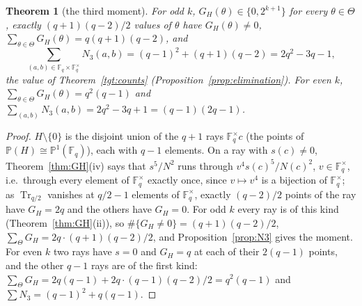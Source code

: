 \documentclass[12pt,a4paper]{amsart}
\newtheorem{theorem}{Theorem}[section]
\theoremstyle{definition}
\newcommand{\F}{\mathbb{F}}
\newcommand{\Tr}{\operatorname{Tr}}
\begin{document}
\begin{theorem}[the third moment]\label{thm:N3value}
For odd $k$, $G_H(\theta)\in\{0,2^{k+1}\}$ for every $\theta\in\Theta$, exactly $(q+1)(q-2)/2$ values of $\theta$ have $G_H(\theta)\ne0$, $\sum_{\theta\in\Theta}G_H(\theta)=q(q+1)(q-2)$, and
\[
\sum_{(a,b)\in\F_q\times\F_q^\times}N_3(a,b)=(q-1)^2+(q+1)(q-2)=2q^2-3q-1 ,
\]
the value of Theorem~\ref{tgt:counts} (Proposition~\ref{prop:elimination}). For even $k$, $\sum_{\theta\in\Theta}G_H(\theta)=q^2(q-1)$ and $\sum_{(a,b)}N_3(a,b)=2q^2-3q+1=(q-1)(2q-1)$.
\end{theorem}
\begin{proof}
$H\setminus\{0\}$ is the disjoint union of the $q+1$ rays $\F_q^\times c$ (the points of $\mathbb P(H)\cong\mathbb P^1(\F_q)$), each with $q-1$ elements. On a ray with $s(c)\ne0$, Theorem~\ref{thm:GH}(iv) says that $s^5/N^2$ runs through $v^4s(c)^5/N(c)^2$, $v\in\F_q^\times$, i.e.\ through every element of $\F_q^\times$ exactly once, since $v\mapsto v^4$ is a bijection of $\F_q^\times$; as $\Tr_{q/2}$ vanishes at $q/2-1$ elements of $\F_q^\times$, exactly $(q-2)/2$ points of the ray have $G_H=2q$ and the others have $G_H=0$. For odd $k$ every ray is of this kind (Theorem~\ref{thm:GH}(ii)), so $\#\{G_H\ne0\}=(q+1)(q-2)/2$, $\sum_\Theta G_H=2q\cdot(q+1)(q-2)/2$, and Proposition~\ref{prop:N3} gives the moment. For even $k$ two rays have $s=0$ and $G_H=q$ at each of their $2(q-1)$ points, and the other $q-1$ rays are of the first kind: $\sum_\Theta G_H=2q(q-1)+2q\cdot(q-1)(q-2)/2=q^2(q-1)$ and $\sum N_3=(q-1)^2+q(q-1)$.
\end{proof}
\end{document}
